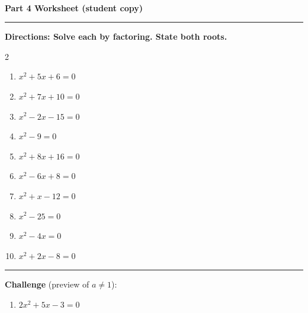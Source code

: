 \documentclass[11pt]{article}
\newcommand{\parthead}[1]{\vspace{6pt}{\color{bigC}\rule{\linewidth}{2pt}}\\[3pt]{\LARGE\bfseries\color{bigC!80!black} #1}\\[2pt]{\color{bigC}\rule{\linewidth}{2pt}}\vspace{6pt}}
\begin{document}
\parthead{Part 4 \; Worksheet (student copy)}
\vspace{6pt}
\textbf{Directions: Solve each by factoring. State both roots.}
\begin{multicols}{2}
\begin{enumerate}[label=\textbf{\arabic*.},itemsep=1.1cm]
\item $x^{2}+5x+6=0$
\item $x^{2}+7x+10=0$
\item $x^{2}-2x-15=0$
\item $x^{2}-9=0$
\item $x^{2}+8x+16=0$
\item $x^{2}-6x+8=0$
\item $x^{2}+x-12=0$
\item $x^{2}-25=0$
\item $x^{2}-4x=0$
\item $x^{2}+2x-8=0$
\end{enumerate}
\end{multicols}
\vspace{2pt}\hrule\vspace{4pt}\textbf{Challenge} (preview of $a\ne1$):
\begin{enumerate}[label=\textbf{\arabic*.},start=11,leftmargin=1.6em]
\item $2x^{2}+5x-3=0$
\end{enumerate}
\end{document}
